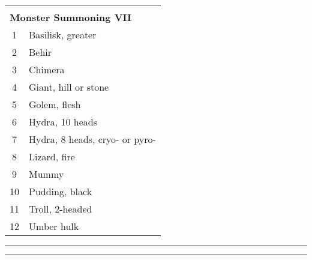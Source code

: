 \documentclass[../main.tex]{subfiles}
\begin{document}
\begin{multicols}{4}
\begin{table}[H]
{\begin{tabular}{cl}
\hline
\\
\multicolumn{2}{l}{{\color[HTML]{4169E1} \textbf{Monster Summoning VII}}} \\
1 & Basilisk, greater \\
2 & Behir \\
3 & Chimera \\
4 & Giant, hill or stone \\
5 & Golem, flesh \\
6 & Hydra, 10 heads \\
7 & Hydra, 8 heads, cryo- or pyro- \\
8 & Lizard, fire \\
9 & Mummy \\
10 & Pudding, black \\
11 & Troll, 2-headed \\
12 & Umber hulk
\end{tabular}%
}
\end{table}
\hrule
\columnbreak
\begin{table}[H]
\fontsize{7.5}{8}
\end{table}
\hrule
\end{multicols}
\end{document}
